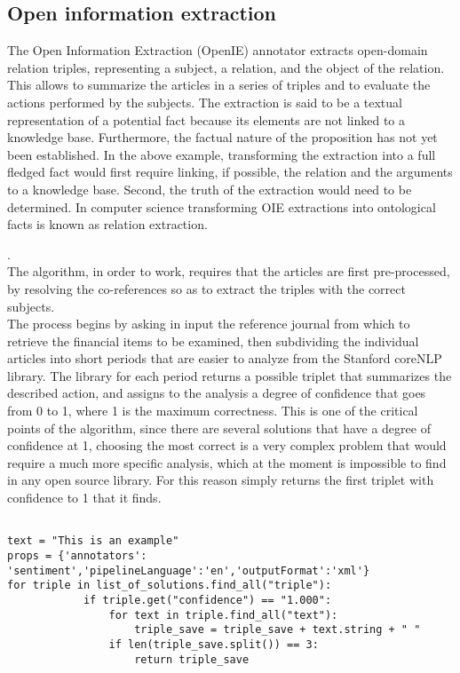 \subsection{Open information extraction}
\par 
The Open Information Extraction (OpenIE) annotator extracts open-domain relation triples, representing a subject, a relation, and the object of the relation. This allows to summarize the articles in a series of triples and to evaluate the actions performed by the subjects. 
The extraction is said to be a textual representation of a potential fact because its elements are not linked to a knowledge base. Furthermore, the factual nature of the proposition has not yet been established. In the above example, transforming the extraction into a full fledged fact would first require linking, if possible, the relation and the arguments to a knowledge base. Second, the truth of the extraction would need to be determined. In computer science transforming OIE extractions into ontological facts is known as relation extraction.
\par 
\cite{openIEwiki}. \\
The algorithm, in order to work, requires that the articles are first pre-processed, by resolving the co-references so as to extract the triples with the correct subjects. \\
The process begins by asking in input the reference journal from which to retrieve the financial items to be examined, then subdividing the individual articles into short periods that are easier to analyze from the Stanford coreNLP library. The library for each period returns a possible triplet that summarizes the described action, and assigns to the analysis a degree of confidence that goes from 0 to 1, where 1 is the maximum correctness. This is one of the critical points of the algorithm, since there are several solutions that have a degree of confidence at 1, choosing the most correct is a very complex problem that would require a much more specific analysis, which at the moment is impossible to find in any open source library. For this reason simply returns the first triplet with confidence to 1 that it finds.
\begin{verbatim}
               
text = "This is an example"
props = {'annotators': 'sentiment','pipelineLanguage':'en','outputFormat':'xml'}
for triple in list_of_solutions.find_all("triple"):
            if triple.get("confidence") == "1.000":
                for text in triple.find_all("text"):
                    triple_save = triple_save + text.string + " "
                if len(triple_save.split()) == 3:
                    return triple_save
\end{verbatim}

